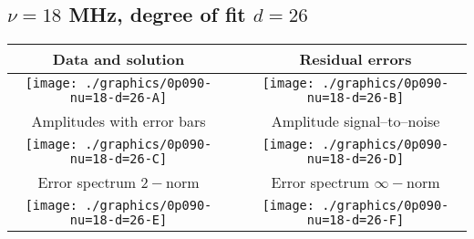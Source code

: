 

% 

\clearpage{}
\break{}

\subsection{$\nu = 18$ MHz, degree of fit $d = 26$}

\begin{table}[h]
    \begin{center}
        \begin{tabular}{ccc}
            Data and solution & \quad & Residual errors \\\hline
            \texttt{[image: ./graphics/0p090-nu=18-d=26-A]} &&
            \texttt{[image: ./graphics/0p090-nu=18-d=26-B]} \\[15pt]
            Amplitudes with error bars && Amplitude signal--to--noise \\\hline
            \texttt{[image: ./graphics/0p090-nu=18-d=26-C]} &&
            \texttt{[image: ./graphics/0p090-nu=18-d=26-D]} \\[15pt]
            Error spectrum $2-$norm && Error spectrum $\infty-$norm \\\hline
            \texttt{[image: ./graphics/0p090-nu=18-d=26-E]} &&
            \texttt{[image: ./graphics/0p090-nu=18-d=26-F]} \\[15pt]
        \end{tabular}
    \end{center}
\label{fig:elev=90, nu=18}
\end{table}



\endinput
